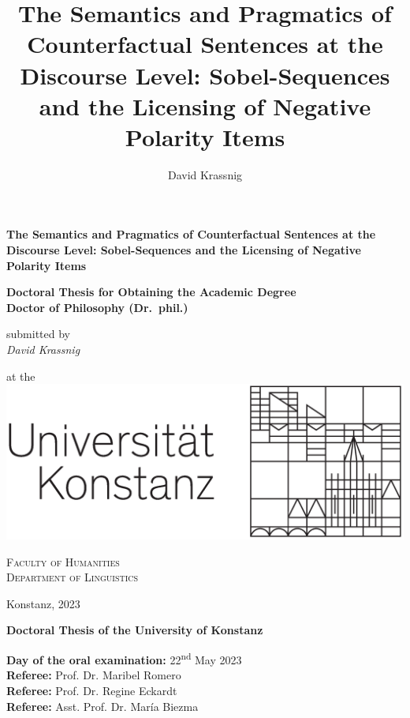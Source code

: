 
\title{The Semantics and Pragmatics of Counterfactual Sentences at the Discourse Level: Sobel-Sequences and the Licensing of Negative Polarity Items}

\author{David Krassnig}






\setul{3pt}{1.5pt}
\begin{titlepage}\doublespacing
\begin{adjustwidth}{-4mm}{-4mm}
\begin{center}
\textbf{\huge The Semantics and Pragmatics of Counterfactual Sentences at the Discourse Level: Sobel-Sequences and the Licensing of Negative Polarity Items}
\end{center}
\end{adjustwidth}

\textbf{\large Doctoral Thesis for Obtaining the Academic Degree\\ Doctor of Philosophy (Dr.~phil.)}

submitted by\\{\large \textit{David Krassnig}}%

at the\\\vspace{-2.5mm}
\includegraphics[scale=0.25]{content/graphics/unikonstanz_signet}


{\large\scshape Faculty of Humanities\\
Department of Linguistics}


Konstanz, 2023
\end{titlepage}
\thispagestyle{empty}
\hbox{}\vfill\begin{flushleft}
\noindent\textbf{{Doctoral Thesis of the University of Konstanz}}

\enlargethispage{2.95\baselineskip}\noindent\textbf{Day of the oral examination:} 22\textsuperscript{nd} May 2023\\
\textbf{Referee:} Prof. Dr. Maribel Romero\\
\textbf{Referee:} Prof. Dr. Regine Eckardt\\
\textbf{Referee:} Asst. Prof. Dr. María Biezma
\end{flushleft}



